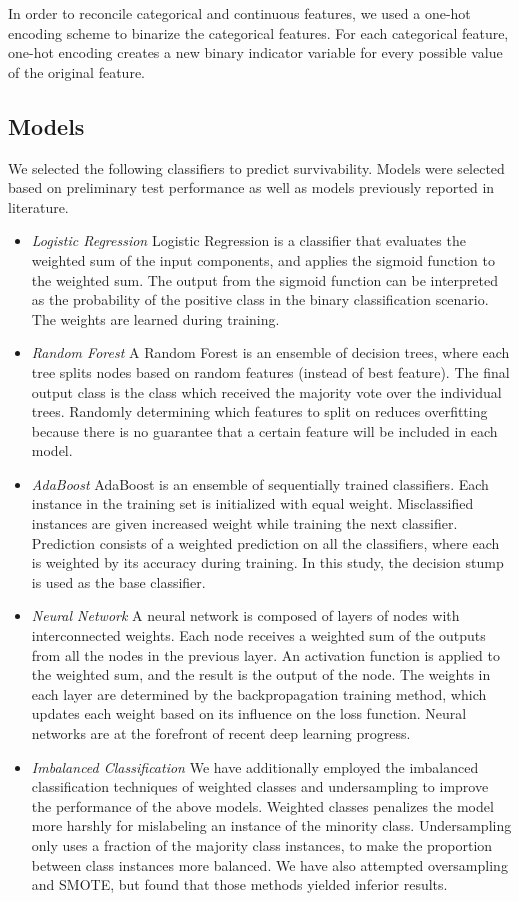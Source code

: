 \documentclass[review]{elsarticle}
\begin{document}
In order to reconcile categorical and continuous features, we used a one-hot encoding scheme to binarize the categorical features. For each categorical feature, one-hot encoding creates a new binary indicator variable for every possible value of the original feature. 


\subsection*{Models}
We selected the following classifiers to predict survivability. Models were selected based on preliminary test performance as well as models previously reported in literature.
\begin{itemize}
	\item \textit{Logistic Regression} Logistic Regression is a classifier that evaluates the weighted sum of the input components, and applies the sigmoid function to the weighted sum. The output from the sigmoid function can be interpreted as the probability of the positive class in the binary classification scenario. The weights are learned during training.
	\item \textit{Random Forest} A Random Forest is an ensemble of decision trees, where each tree splits nodes based on random features (instead of best feature). The final output class is the class which received the majority vote over the individual trees. Randomly determining which features to split on reduces overfitting because there is no guarantee that a certain feature will be included in each model. 
	\item \textit{AdaBoost} AdaBoost\cite{freund1999short} is an ensemble of sequentially trained classifiers. Each instance in the training set is initialized with equal weight. Misclassified instances are given increased weight while training the next classifier. Prediction consists of a weighted prediction on all the classifiers, where each is weighted by its accuracy during training. In this study, the decision stump is used as the base classifier.
	\item \textit {Neural Network} A neural network is composed of layers of nodes with interconnected weights. Each node receives a weighted sum of the outputs from all the nodes in the previous layer. An activation function is applied to the weighted sum, and the result is the output of the node. The weights in each layer are determined by the backpropagation training method, which updates each weight based on its influence on the loss function. Neural networks are at the forefront of recent deep learning progress.
	\item \textit {Imbalanced Classification} We have additionally employed the imbalanced classification techniques of weighted classes and undersampling to improve the performance of the above models. Weighted classes penalizes the model more harshly for mislabeling an instance of the minority class. Undersampling only uses a fraction of the majority class instances, to make the proportion between class instances more balanced\cite{he2008learning}. We have also attempted oversampling and SMOTE, but found that those methods yielded inferior results.
	
\end{itemize}
\end{document}

